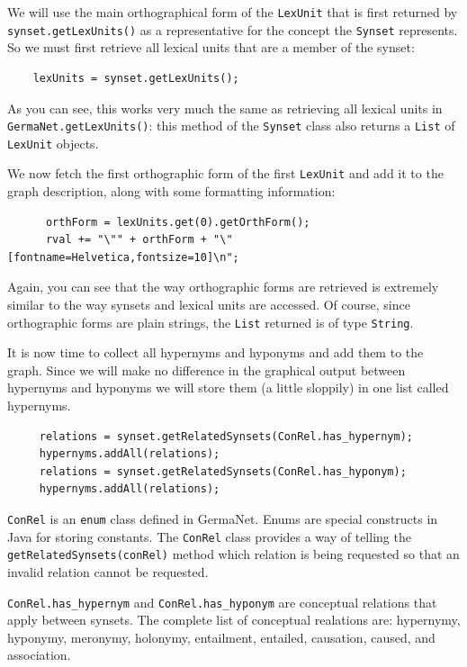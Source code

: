 \documentclass[12pt,a4paper,english,utf8]{report}
\begin{document}
We will use the main orthographical form of the \texttt{LexUnit} that is first returned by \texttt{synset.getLexUnits()} as a representative for the concept the \texttt{Synset} represents. So we must first retrieve all lexical units that are a member of the synset:

\begin{lstlisting}
    lexUnits = synset.getLexUnits();
\end{lstlisting}

As you can see, this works very much the same as retrieving all lexical units in \texttt{GermaNet.getLexUnits()}: this method of the \texttt{Synset} class also returns a \texttt{List} of \texttt{LexUnit} objects.

We now fetch the first orthographic form of the first \texttt{LexUnit} and add it to the graph description, along with some formatting information:

\begin{lstlisting}
      orthForm = lexUnits.get(0).getOrthForm();
      rval += "\"" + orthForm + "\" [fontname=Helvetica,fontsize=10]\n";

\end{lstlisting}

Again, you can see that the way orthographic forms are retrieved is extremely similar to the way synsets and lexical units are accessed. Of course, since orthographic forms are plain strings, the \texttt{List} returned is of type \texttt{String}.

It is now time to collect all hypernyms and hyponyms and add them to the graph. Since we will make no difference in the graphical output between hypernyms and hyponyms we will store them (a little sloppily) in one list called hypernyms.

\begin{lstlisting}
     relations = synset.getRelatedSynsets(ConRel.has_hypernym);
     hypernyms.addAll(relations);
     relations = synset.getRelatedSynsets(ConRel.has_hyponym);
     hypernyms.addAll(relations);
\end{lstlisting}

\texttt{ConRel} is an \texttt{enum} class defined in GermaNet. Enums are special constructs in Java for storing constants. The \texttt{ConRel} class provides a way of telling the \texttt{getRelatedSynsets(conRel)} method which relation is being requested so that an invalid relation cannot be requested.

\texttt{ConRel.has\_hypernym} and \texttt{ConRel.has\_hyponym} are conceptual relations that apply between synsets. The complete list of conceptual realations are: hypernymy, hyponymy, meronymy, holonymy, entailment, entailed, causation, caused, and association.
\end{document}
